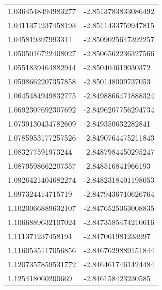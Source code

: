 \begin{supertabular}{ll}
1.0364548494983277  & -2.8513783833086492  \\
1.0411371237458193  & -2.8511433759947815  \\
1.045819397993311   & -2.8509025647392257  \\
1.0505016722408027  & -2.8506562236327566  \\
1.0551839464882944  & -2.850404619030372   \\
1.0598662207357858  & -2.850148009737053   \\
1.0645484949832775  & -2.8498866471888324  \\
1.0692307692307692  & -2.8496207756294734  \\
1.0739130434782609  & -2.849350632282841   \\
1.0785953177257526  & -2.8490764475211843  \\
1.083277591973244   & -2.8487984450295247  \\
1.0879598662207357  & -2.848516841966193   \\
1.0926421404682274  & -2.8482318491198053  \\
1.097324414715719   & -2.8479436710626764  \\
1.1020066889632107  & -2.8476525063008835  \\
1.1066889632107024  & -2.8473585474210616  \\
1.111371237458194   & -2.847061981233997   \\
1.1160535117056856  & -2.8467629889151844  \\
1.1207357859531772  & -2.8464617461424484  \\
1.125418060200669   & -2.846158423230585   \\
\end{supertabular}
